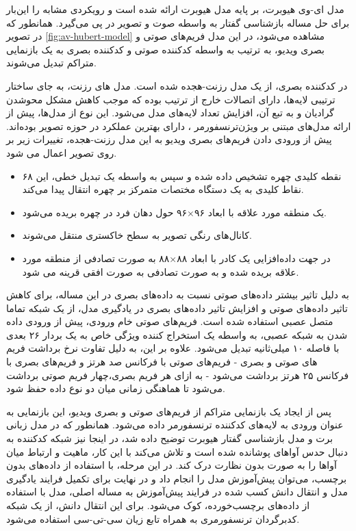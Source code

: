 مدل ای-وی هیوبرت، بر پایه مدل هیوبرت ارائه شده است و رویکردی مشابه را این‌بار برای حل مساله بازشناسی گفتار به واسطه صوت و تصویر در پی می‌گیرد. همانطور که در تصویر 
\ref{fig:av-hubert-model}
مشاهده می‌شود، در این مدل فریم‌های صوتی و بصری ویدیو، به ترتیب به واسطه کدکننده صوتی و کدکننده بصری به یک بازنمایی متراکم
تبدیل می‌شوند.

در کدکننده بصری، از یک مدل رزنت-هجده 
شده است. مدل های رزنت، به جای ساختار ترتیبی لایه‌ها، دارای اتصالات خارج از ترتیب بوده که موجب کاهش مشکل محوشدن گرادیان
و به تبع آن، افزایش تعداد لایه‌های مدل می‌شود. این نوع از مدل‌ها، پیش از ارائه مدل‌های مبتنی بر ویژن‌ترنسفورمر
، دارای بهترین عملکرد در حوزه تصویر بوده‌اند. پیش از ورودی دادن فریم‌های بصری ویدیو به این مدل رزنت-هجده، تغییرات زیر بر روی تصویر اعمال می شود.

\begin{itemize}
	\item ۶۸ نقطه کلیدی چهره تشخیص داده شده و سپس به واسطه یک تبدیل خطی، این نقاط کلیدی به یک دستگاه مختصات متمرکز بر چهره انتقال پیدا می‌کند.
	\item یک منطقه مورد علاقه
	با ابعاد ۹۶×۹۶ حول دهان فرد در چهره بریده می‌شود.
	\item کانال‌های رنگی تصویر به سطح خاکستری منتقل می‌شوند.
	\item در جهت داده‌افزایی
	یک کادر با ابعاد ۸۸×۸۸ به صورت تصادفی از منطقه مورد علاقه بریده شده و به صورت تصادفی به صورت افقی قرینه
	می شود.
\end{itemize}

به دلیل تاثیر بیشتر داده‌های صوتی نسبت به داده‌های بصری در این مساله، برای کاهش تاثیر داده‌های صوتی و افزایش تاثیر داده‌های بصری در یادگیری مدل، از یک شبکه تماما متصل عصبی استفاده شده است. فریم‌های صوتی خام ورودی، پیش از ورودی داده شدن به شبکه عصبی، به واسطه یک استخراج کننده ویژگی خاص
به یک بردار ۲۶ بعدی با فاصله ۱۰ میلی‌ثانیه تبدیل می‌شود. علاوه بر این، به دلیل تفاوت نرخ برداشت فریم های صوتی و بصری - فریم‌های صوتی با فرکانس صد هرتز و فریم‌های بصری با فرکانس ۲۵ هرتز برداشت می‌شود - به ازای هر فریم بصری،چهار فریم صوتی برداشت می‌شود تا هماهنگی زمانی میان دو نوع داده حفظ شود.

پس از ایجاد یک بازنمایی متراکم از فریم‌های صوتی و بصری ویدیو، این بازنمایی به عنوان ورودی به لایه‌های کدکننده ترنسفورمر داده می‌شود. همانطور که در مدل زبانی برت و مدل بازشناسی گفتار هیوبرت توضیح داده شد، در اینجا نیز شبکه کدکننده به دنبال حدس آواهای پوشانده شده است و تلاش می‌کند با این کار، ماهیت و ارتباط میان آواها را به صورت بدون نظارت درک کند. در این مرحله، با استفاده از داده‌های بدون برچسب، می‌توان پیش‌آموزش
مدل را انجام داد و در نهایت برای تکمیل فرایند یادگیری مدل و انتقال دانش کسب شده در فرایند پیش‌آموزش به مساله اصلی، مدل با استفاده از داده‌های برچسب‌خورده، کوک می‌شود. برای این انتقال دانش، از یک شبکه کدبرگردان
ترنسفورمری به همراه تابع زیان سی-تی-سی
 استفاده می‌شود.
 
